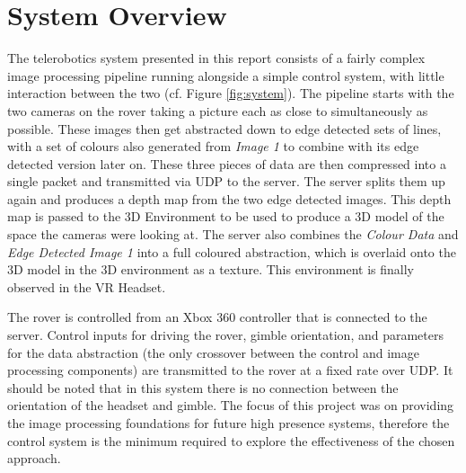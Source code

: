 \chapter{System Overview}
\label{chapter:system}

The telerobotics system presented in this report consists of a fairly complex image processing pipeline running alongside a simple control system, with little interaction between the two (cf. Figure \ref{fig:system}). The pipeline starts with the two cameras on the rover taking a picture each as close to simultaneously as possible. These images then get abstracted down to edge detected sets of lines, with a set of colours also generated from \emph{Image 1} to combine with its edge detected version later on. These three pieces of data are then compressed into a single packet and transmitted via UDP \cite{postel1980user} to the server. The server splits them up again and produces a depth map from the two edge detected images. This depth map is passed to the 3D Environment to be used to produce a 3D model of the space the cameras were looking at. The server also combines the \emph{Colour Data} and \emph{Edge Detected Image 1} into a full coloured abstraction, which is overlaid onto the 3D model in the 3D environment as a texture. This environment is finally observed in the VR Headset.

The rover is controlled from an Xbox 360 controller \cite{360pad} that is connected to the server. Control inputs for driving the rover, gimble orientation, and parameters for the data abstraction (the only crossover between the control and image processing components) are transmitted to the rover at a fixed rate over UDP. It should be noted that in this system there is no connection between the orientation of the headset and gimble. The focus of this project was on providing the image processing foundations for future high presence systems, therefore the control system is the minimum required to explore the effectiveness of the chosen approach.

